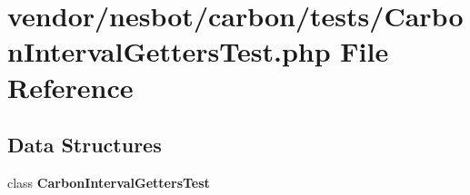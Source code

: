 \section{vendor/nesbot/carbon/tests/\+Carbon\+Interval\+Getters\+Test.php File Reference}
\label{_carbon_interval_getters_test_8php}
\subsection*{Data Structures}
\begin{DoxyCompactItemize}
\item 
class {\bf Carbon\+Interval\+Getters\+Test}
\end{DoxyCompactItemize}
